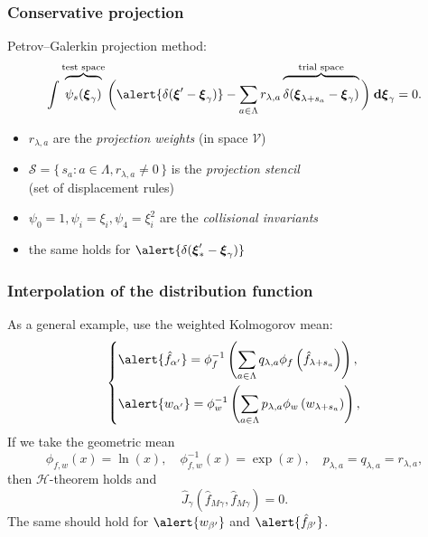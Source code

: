 \documentclass[mathserif]{beamer} %
\newcommand{\dd}{\:\mathrm{d}}
\newcommand{\dxi}{\boldsymbol{\dd\xi}}
\newcommand{\bxi}{\boldsymbol{\xi}}
\newcommand{\Set}[2]{\{\,{#1}:{#2}\,\}}
\newcommand{\xoverbrace}[2][\vphantom{\int}]{\overbrace{#1#2}}
\begin{document}
\begin{frame}
    \frametitle{Conservative projection}
    \vspace{10pt}

    Petrov--Galerkin projection method:
    \begin{equation}\label{eq:Petrov-Galerkin}
        \int \xoverbrace{ \psi_s(\bxi_\gamma) }^\text{test space} \bigg(
            \alert{\delta(\bxi'-\bxi_\gamma)} - \sum_{a\in\Lambda} r_{\lambda,a}
            \xoverbrace{ \delta(\bxi_{\lambda+s_a}-\bxi_\gamma) }^\text{trial space}
        \bigg) \dxi_\gamma = 0.
    \end{equation}
    \begin{itemize}
        \item \(r_{\lambda,a}\) are the \emph{projection weights} (in space \(\mathcal{V}\))
        \item \(\mathcal{S} = \Set{s_a}{a\in\Lambda, r_{\lambda,a}\neq0}\) is the \emph{projection stencil}
            \\ (set of displacement rules)
        \item \(\psi_0 = 1, \psi_i = \xi_i, \psi_4 = \xi_i^2\) are the \emph{collisional invariants}
        \item the same holds for \(\alert{\delta(\bxi'_*-\bxi_\gamma)}\)
    \end{itemize}
\end{frame}

\begin{frame}
    \frametitle{Interpolation of the distribution function}
    As a general example, use the weighted Kolmogorov mean: %
    \begin{equation}\label{eq:Kolmogorov_mean}
        \begin{dcases}
            \alert{\hat{f}_{\alpha'}} = \phi^{-1}_f\left(\sum_{a\in\Lambda} q_{\lambda,a}
                \phi_f\left(\hat{f}_{\lambda+s_a}\right)\right), \\
            \alert{w_{\alpha'}} = \phi^{-1}_w\left(\sum_{a\in\Lambda} p_{\lambda,a}
                \phi_w\left(w_{\lambda+s_a}\right)\right), \\
        \end{dcases}
    \end{equation}
    If we take the geometric mean
    \begin{equation}\label{eq:geometric_mean}
       \phi_{f,w}(x) = \ln(x), \quad \phi_{f,w}^{-1}(x) = \exp(x), \quad p_{\lambda,a} = q_{\lambda,a} = r_{\lambda,a},
    \end{equation}
    then \(\mathcal{H}\)-theorem holds and
    \begin{equation}\label{eq:strict_interpolation}
        \hat{J}_\gamma(\hat{f}_{M\gamma}, \hat{f}_{M\gamma}) = 0.
    \end{equation}
    The same should hold for \(\alert{w_{\beta'}}\) and \(\alert{\hat{f}_{\beta'}}\).
\end{frame}
\end{document}
